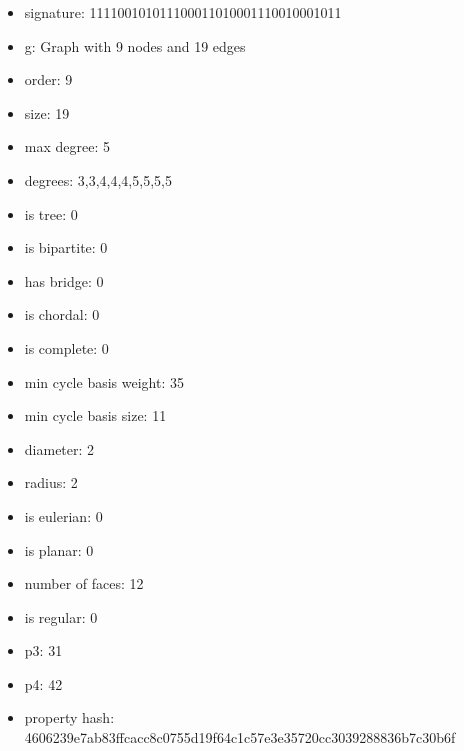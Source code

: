 \newpage
\begin{figure}
\end{figure}
\begin{itemize}
\item signature: 111100101011100011010001110010001011
\item g: Graph with 9 nodes and 19 edges
\item order: 9
\item size: 19
\item max degree: 5
\item degrees: 3,3,4,4,4,5,5,5,5
\item is tree: 0
\item is bipartite: 0
\item has bridge: 0
\item is chordal: 0
\item is complete: 0
\item min cycle basis weight: 35
\item min cycle basis size: 11
\item diameter: 2
\item radius: 2
\item is eulerian: 0
\item is planar: 0
\item number of faces: 12
\item is regular: 0
\item p3: 31
\item p4: 42
\item property hash: 4606239e7ab83ffcacc8c0755d19f64c1c57e3e35720cc3039288836b7c30b6f
\end{itemize}
